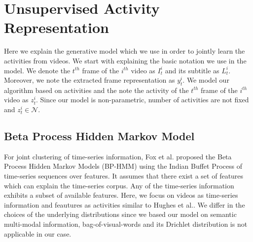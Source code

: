 \section{Unsupervised Activity Representation}
Here we explain the generative model which we use in order to jointly learn the activities from videos. We start with explaining the basic notation we use in the model. We denote the $t^{th}$ frame of the $i^{th}$ video as $I^i_t$ and its subtitle as $L^i_t$. Moreover, we note the extracted frame representation as $y^i_t$. We model our algorithm based on activities and the note the activity of the $t^{th}$ frame of the $i^{th}$ video as $z^i_t$. Since our model is non-parametric, number of activities are not fixed and $z^i_t \in \mathcal{N}$.

\subsection{Beta Process Hidden Markov Model}
For joint clustering of time-series information, Fox et al.\cite{foxBPHMM} proposed the Beta Process Hidden Markov Models (BP-HMM) using the Indian Buffet Process\cite{ibp} of time-series sequences over features. It assumes that there exist a set of features which can explain the time-series corpus. Any of the time-series information exhibits a subset of available features. Here, we focus on videos as time-series information and feautures as activities similar to Hughes et al.\cite{npActivity}. We differ in the choices of the underlying distributions since we based our model on semantic multi-modal information, bag-of-visual-words and its Drichlet distribution is not applicable in our case.

